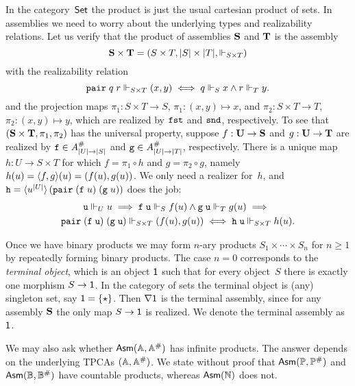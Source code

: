 In the category~$\mathsf{Set}$ the product is just the usual cartesian product
of sets. In assemblies we need to worry about the underlying types and
realizability relations. Let us verify that the product of assemblies
$\mathbf{S}$ and $\mathbf{T}$ is the assembly
%
\begin{equation*}
  \mathbf{S} \times \mathbf{T} =
  (S \times T, |S| \times |T|, {\Vdash_{S \times T}})
\end{equation*}
%
with the realizability relation
%
\begin{equation*}
  \mathtt{pair}\;q\;r \Vdash_{S \times T} (x,y)
  \iff
  q \Vdash_S x
  \land
  r \Vdash_T y.
\end{equation*}
%
and the projection maps $\pi_1 : S \times T \to S$, $\pi_1 : (x,y)
\mapsto x$, and $\pi_2 : S \times T \to T$, $\pi_2 : (x,y) \mapsto y$,
which are realized by $\mathtt{fst}$ and $\mathtt{snd}$, respectively.
%
To see that $(\mathbf{S} \times \mathbf{T}, \pi_1, \pi_2)$ has the universal
property, suppose $f : \mathbf{U} \to \mathbf{S}$ and $g : \mathbf{U} \to
\mathbf{T}$ are realized by $\mathtt{f} \in A^{\#}_{|U| \to |S|}$ and $\mathtt{g}
\in A^{\#}_{|U| \to |T|}$, respectively. There is a unique map $h :
U \to S \times T$ for which $f = \pi_1 \circ h$ and $g = \pi_2 \circ g$,
namely $h(u) = \langle f,g \rangle(u) = (f(u), g(u))$. We only need a realizer
for~$h$, and $\mathtt{h} =
\langle u^{|U|} \rangle\,(\mathtt{pair}\;(\mathtt{f}\;u)\;(\mathtt{g}\;u))$ does the
job:
%
\begin{multline*}
  \mathtt{u} \Vdash_U u
  \implies
  \mathtt{f}\;\mathtt{u} \Vdash_S f(u)
  \land
  \mathtt{g}\;\mathtt{u} \Vdash_T g(u)
  \implies {} \\
  \mathtt{pair}\; (\mathtt{f}\;\mathtt{u})\; (\mathtt{g}\;\mathtt{u}) \Vdash_{S \times T} (f(u), g(u))
  \iff
  \mathtt{h}\;\mathtt{u} \Vdash_{S \times T} h(u).
\end{multline*}

Once we have binary products we may form $n$-ary products $S_1 \times
\cdots \times S_n$ for $n \geq 1$ by repeatedly forming binary
products. The case $n = 0$ corresponds to the \emph{terminal object},
which is an object $\mathsf{1}$ such that for every object~$S$ there is
exactly one morphism $S \to \mathsf{1}$. In the category of sets the
terminal object is (any) singleton set, say $\mathsf{1} = \{\star\}$. Then
$\nabla \mathsf{1}$ is the terminal assembly, since for any assembly
$\mathbf{S}$ the only map $S \to \mathsf{1}$ is realized. We denote the
terminal assembly as $\mathsf{1}$.

We may also ask whether $\mathsf{Asm}(\mathbb{A},\mathbb{A}^{\#})$ has infinite products. The answer
depends on the underlying TPCAs $(\mathbb{A}, \mathbb{A}^{\#})$. We state without
proof that $\mathsf{Asm}(\mathbb{P}, \mathbb{P}^{\#})$ and $\mathsf{Asm}(\mathbb{B},
  \mathbb{B}^{\#})$ have countable products, whereas $\mathsf{Asm}(\mathbb{N})$ does
not.

